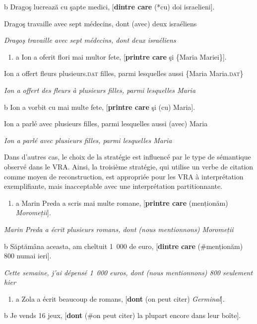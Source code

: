   b  Dragoş lucrează cu şapte medici, [\textbf{dintre care} (*cu) doi israelieni].

    Dragoş travaille avec sept médecins, dont (avec) deux israéliens

    \textit{Dragoş travaille avec sept médecins, dont deux israéliens}


\begin{enumerate}
\item \label{bkm:Ref295810602}a  Ion a oferit flori mai multor fete, [\textbf{printre care} şi \{Maria {\textbar} Mariei\}]. 


\end{enumerate}
  Ion a offert fleurs plusieurs\textsc{.dat} filles, parmi lesquelles aussi \{Maria {\textbar} Maria.\textsc{dat}\} 

  \textit{Ion a offert des fleurs à plusieurs filles, parmi lesquelles Maria} 

  b  Ion a vorbit cu mai multe fete, [\textbf{printre care} şi (cu) Maria].

    Ion a parlé avec plusieurs filles, parmi lesquelles aussi (avec) Maria

    \textit{Ion a parlé avec plusieurs filles, parmi lesquelles Maria}

Dans d'autres cas, le choix de la stratégie est influencé par le type de sémantique observé dans le VRA. Ainsi, la troisième stratégie, qui utilise un verbe de citation comme moyen de reconstruction, est appropriée pour les VRA à interprétation exemplifiante, mais inacceptable avec une interprétation partitionnante.


\begin{enumerate}
\item a  Marin Preda a scris mai multe romane, [\textbf{printre care} (menționăm) \textit{Moromeții}].  


\end{enumerate}
{\itshape
Marin Preda a écrit plusieurs romans, dont (nous mentionnons) Moromeții}

  b  Săptămâna aceasta, am cheltuit 1~000 de euro, [\textbf{dintre} \textbf{care} (\#menționăm) 800 numai ieri].

{\itshape
Cette semaine, j'ai dépensé 1~000 euros, dont (nous mentionnons) 800 seulement hier } 


\begin{enumerate}
\item a  Zola a écrit beaucoup de romans, [\textbf{dont} (on peut citer) \textit{Germinal}]. 


\end{enumerate}
  b  Je vends 16 jeux, [\textbf{dont} (\#on peut citer) la plupart encore dans leur boîte].

